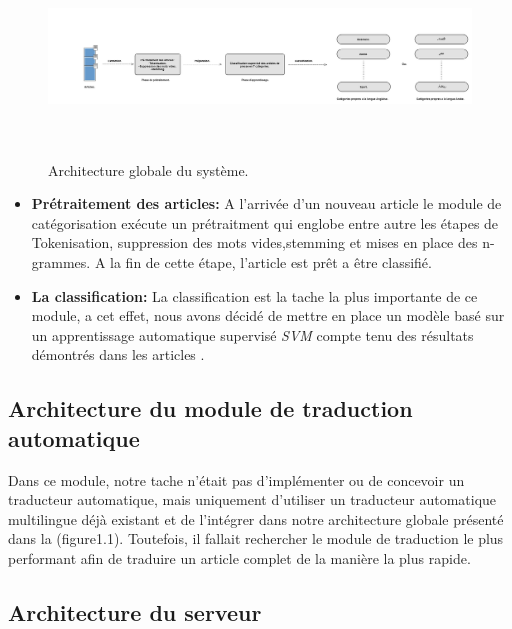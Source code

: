 \begin{figure}[H]
    \centering
    \includegraphics[height=150pt,width=500pt]{img/chapter3/categsche.jpg}
    \caption{Architecture globale du système.}
\end{figure}

\begin{itemize}
    
    \item \textbf{Prétraitement des articles:}
    A l'arrivée d'un nouveau article le module de catégorisation exécute un prétraitment qui englobe entre autre les étapes de Tokenisation, suppression des mots vides,stemming et mises en place des n-grammes.
    A la fin de cette étape, l'article est prêt a être classifié.\\
    
    \item \textbf{La classification:}
    La classification est la tache la plus importante de ce module, a cet effet, nous avons décidé de mettre en place un modèle basé sur un apprentissage automatique supervisé \emph{SVM} compte tenu des résultats démontrés dans les articles \cite{}\cite{}.\\ 

\end{itemize}



\subsection{Architecture du module de traduction automatique}
Dans ce module, notre tache n'était pas d'implémenter ou de concevoir un traducteur automatique, mais uniquement d'utiliser un traducteur automatique multilingue déjà existant et de l'intégrer dans notre architecture globale présenté dans la (figure1.1). Toutefois, il fallait rechercher le module de traduction le plus performant afin de traduire un article complet de la manière la plus rapide.

\subsection{Architecture du serveur}



